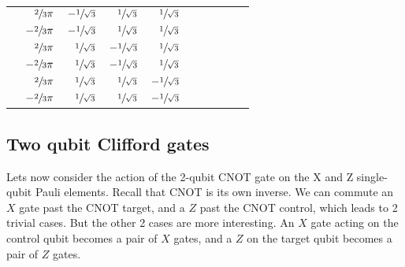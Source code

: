 \begin{table}[htp]
\begin{center}
\begin{tabular}{crrrrrrrcc}
						& $\sfrac{2}{3}\pi$		& $-\sfrac{1}{\sqrt{3}}$ & $\sfrac{1}{\sqrt{3}}$ & $\sfrac{1}{\sqrt{3}}$ & \\
						& $-\sfrac{2}{3}\pi$	& $-\sfrac{1}{\sqrt{3}}$ & $\sfrac{1}{\sqrt{3}}$ & $\sfrac{1}{\sqrt{3}}$ & \\

						& $\sfrac{2}{3}\pi$		& $\sfrac{1}{\sqrt{3}}$ & $-\sfrac{1}{\sqrt{3}}$ & $\sfrac{1}{\sqrt{3}}$ & \\
						& $-\sfrac{2}{3}\pi$	& $\sfrac{1}{\sqrt{3}}$ & $-\sfrac{1}{\sqrt{3}}$ & $\sfrac{1}{\sqrt{3}}$ & \\

						& $\sfrac{2}{3}\pi$		& $\sfrac{1}{\sqrt{3}}$ & $\sfrac{1}{\sqrt{3}}$ & $-\sfrac{1}{\sqrt{3}}$ & \\
						& $-\sfrac{2}{3}\pi$	& $\sfrac{1}{\sqrt{3}}$ & $\sfrac{1}{\sqrt{3}}$ & $-\sfrac{1}{\sqrt{3}}$ &
\end{tabular}
\end{center}
\label{default}
\end{table}%

\subsection{Two qubit Clifford gates}


Lets now consider the action of the 2-qubit CNOT gate on the X and Z single-qubit Pauli elements. Recall that CNOT is its own inverse. We can commute an $X$ gate past the CNOT target, and a $Z$ past the CNOT control, which leads to 2 trivial cases. But the other 2 cases are more interesting. An $X$ gate acting on the control qubit becomes a pair of $X$ gates, and a $Z$ on the target qubit becomes a pair of $Z$ gates.


